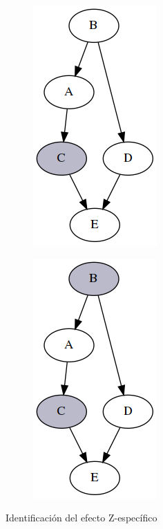 \begin{figure}
	\centering
	\begin{subfigure}{0.49\linewidth}
		\centering
		\includegraphics[width=0.5\linewidth]{images/Chapter 2/z-effect(1)}
		\label{fig:z-effect(a)}
	\end{subfigure}
	\begin{subfigure}{0.49\linewidth}
		\centering
		\includegraphics[width=0.5\linewidth]{images/Chapter 2/z-effect(2)}
		\label{fig:z-effect(b)}
	\end{subfigure}
	\caption{Identificación del efecto Z-específico}
	\label{fig:z-effect}
\end{figure}


